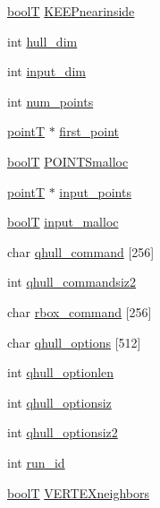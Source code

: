 \begin{DoxyCompactItemize}
\item 
\hyperlink{libqhull_8h_ab1a924b550e00cabe8c367e76b207ea5}{bool\+T} \hyperlink{structqhT_a5277bb8412e3742066f513e219a5b3be}{K\+E\+E\+Pnearinside}
\item 
int \hyperlink{structqhT_a60be326b468c9d72ee426cfb80a70389}{hull\+\_\+dim}
\item 
int \hyperlink{structqhT_a78511ddabe558494734c721f83c31af5}{input\+\_\+dim}
\item 
int \hyperlink{structqhT_abf2d7b05243a91af077d0c88e4a5c8f4}{num\+\_\+points}
\item 
\hyperlink{libqhull_8h_a255fb21ed55a989ae9e4913f15015a97}{point\+T} $\ast$ \hyperlink{structqhT_a109f58e480290f10f06e0e4e216331cd}{first\+\_\+point}
\item 
\hyperlink{libqhull_8h_ab1a924b550e00cabe8c367e76b207ea5}{bool\+T} \hyperlink{structqhT_a5d01975db8ed738ac8d7cd665d85debb}{P\+O\+I\+N\+T\+Smalloc}
\item 
\hyperlink{libqhull_8h_a255fb21ed55a989ae9e4913f15015a97}{point\+T} $\ast$ \hyperlink{structqhT_accab8332d9c564780ce08f8235620687}{input\+\_\+points}
\item 
\hyperlink{libqhull_8h_ab1a924b550e00cabe8c367e76b207ea5}{bool\+T} \hyperlink{structqhT_a01e0cd7e0fd0999801a666a56f40c4a2}{input\+\_\+malloc}
\item 
char \hyperlink{structqhT_a9a268ce0a67e8139c88a36818f4877d2}{qhull\+\_\+command} \mbox{[}256\mbox{]}
\item 
int \hyperlink{structqhT_a60aba5f4faf7649de92301a5e49f6d3c}{qhull\+\_\+commandsiz2}
\item 
char \hyperlink{structqhT_a6be8aae7c4531b79133b5508a88946f2}{rbox\+\_\+command} \mbox{[}256\mbox{]}
\item 
char \hyperlink{structqhT_a6ec6bf19cd13c9c93cfd81f10080963f}{qhull\+\_\+options} \mbox{[}512\mbox{]}
\item 
int \hyperlink{structqhT_ac9615fc577ee88c4026f339a5051d23f}{qhull\+\_\+optionlen}
\item 
int \hyperlink{structqhT_a340b435f1f4db9092efe5ec6b1d3dd3b}{qhull\+\_\+optionsiz}
\item 
int \hyperlink{structqhT_a7e9aab285cd1024ba9d8c2769f418c6b}{qhull\+\_\+optionsiz2}
\item 
int \hyperlink{structqhT_a4e5744c3f66cbaa8848c0b35778ec833}{run\+\_\+id}
\item 
\hyperlink{libqhull_8h_ab1a924b550e00cabe8c367e76b207ea5}{bool\+T} \hyperlink{structqhT_ac7e5b9fd7985b2e322a17d1038597cfb}{V\+E\+R\+T\+E\+Xneighbors}

\end{DoxyCompactItemize}

